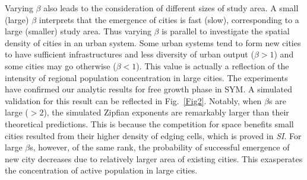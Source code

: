 \documentclass[reprint,unsortedaddress,amsmath,amssymb,aps,prl,showkeys]{revtex4-2}
\begin{document}
Varying $\beta$ also leads to the consideration of different sizes of study area. A small (large) $\beta$ interprets that the emergence of cities is fast (slow), corresponding to a large (smaller) study area. %
Thus varying $\beta$ is parallel to investigate the spatial density of cities in an urban system. Some urban systems tend to form new cities to have sufficient infrastructures and less diversity of urban output\cite{batty2008size} ($\beta > 1$) and some cities may go otherwise ($\beta< 1$). This value is actually a reflection of the intensity of regional population concentration in large cities. The experiments have confirmed our analytic results for free growth phase in SYM. %
A simulated validation for this result can be reflected in Fig.~\ref{Fig2}. Notably, when $\beta$s are large ($>2$), the simulated Zipfian exponents are remarkably larger than their theoretical predictions. This is because the competition for space benefits small %
cities resulted from their higher density of edging cells, which is proved in \textit{SI}. For large $\beta$s, however, of the same rank, the probability of successful emergence of new city decreases due to relatively larger area of existing cities. This exasperates the concentration of active population in large cities.%
\end{document}

